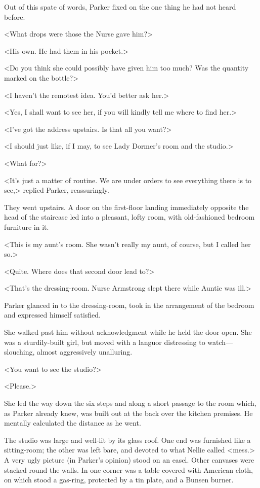 Out of this spate of words, Parker fixed on the one thing he had not heard before.

<What drops were those the Nurse gave him?>

<His own. He had them in his pocket.>

<Do you think she could possibly have given him too much? Was the quantity marked on the bottle?>

<I haven't the remotest idea. You'd better ask her.>

<Yes, I shall want to see her, if you will kindly tell me where to find her.>

<I've got the address upstairs. Is that all you want?>

<I should just like, if I may, to see Lady Dormer's room and the studio.>

<What for?>

<It's just a matter of routine. We are under orders to see everything there is to see,> replied Parker, reassuringly.

They went upstairs. A door on the first-floor landing immediately opposite the head of the staircase led into a pleasant, lofty room, with old-fashioned bedroom furniture in it.

<This is my aunt's room. She wasn't really my aunt, of course, but I called her so.>

<Quite. Where does that second door lead to?>

<That's the dressing-room. Nurse Armstrong slept there while Auntie was ill.>

Parker glanced in to the dressing-room, took in the arrangement of the bedroom and expressed himself satisfied.

She walked past him without acknowledgment while he held the door open. She was a sturdily-built girl, but moved with a languor distressing to watch—slouching, almost aggressively unalluring.

<You want to see the studio?>

<Please.>

She led the way down the six steps and along a short passage to the room which, as Parker already knew, was built out at the back over the kitchen premises. He mentally calculated the distance as he went.

The studio was large and well-lit by its glass roof. One end was furnished like a sitting-room; the other was left bare, and devoted to what Nellie called <mess.> A very ugly picture (in Parker's opinion) stood on an easel. Other canvases were stacked round the walls. In one corner was a table covered with American cloth, on which stood a gas-ring, protected by a tin plate, and a Bunsen burner.

